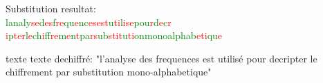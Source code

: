 \documentclass[10pt,xcolor=table]{beamer}
\begin{document}
\begin{frame}
\begin{exampleblock}{Substitution}
resultat:\\
\textcolor{green}{l}\textcolor{green}{a}\textcolor{green}{n}\textcolor{green}{a}\textcolor{green}{l}\textcolor{green}{y}\textcolor{red}{s}\textcolor{red}{e}\textcolor{green}{d}\textcolor{red}{e}\textcolor{red}{s}\textcolor{green}{f}\textcolor{red}{r}\textcolor{red}{e}\textcolor{green}{q}\textcolor{green}{u}\textcolor{red}{e}\textcolor{green}{n}\textcolor{green}{c}\textcolor{red}{e}\textcolor{red}{s}\textcolor{red}{e}\textcolor{red}{s}\textcolor{red}{t}\textcolor{green}{u}\textcolor{red}{t}\textcolor{red}{i}\textcolor{green}{l}\textcolor{red}{i}\textcolor{red}{s}\textcolor{red}{e}\textcolor{green}{p}\textcolor{green}{o}\textcolor{green}{u}\textcolor{red}{r}\textcolor{green}{d}\textcolor{red}{e}\textcolor{green}{c}\textcolor{red}{r}
\textcolor{red}{i}\textcolor{green}{p}\textcolor{red}{t}\textcolor{red}{e}\textcolor{red}{r}\textcolor{green}{l}\textcolor{red}{e}\textcolor{green}{c}\textcolor{green}{h}\textcolor{red}{i}\textcolor{green}{f}\textcolor{green}{f}\textcolor{red}{r}\textcolor{red}{e}\textcolor{green}{m}\textcolor{red}{e}\textcolor{green}{n}\textcolor{red}{t}\textcolor{green}{p}\textcolor{green}{a}\textcolor{red}{r}\textcolor{red}{s}\textcolor{green}{u}\textcolor{green}{b}\textcolor{red}{s}\textcolor{red}{t}\textcolor{red}{i}\textcolor{red}{t}\textcolor{green}{u}\textcolor{red}{t}\textcolor{red}{i}\textcolor{green}{o}\textcolor{green}{n}\textcolor{green}{m}\textcolor{green}{o}\textcolor{green}{n}\textcolor{green}{o}\textcolor{green}{a}\textcolor{green}{l}\textcolor{green}{p}\textcolor{green}{h}\textcolor{green}{a}\textcolor{green}{b}\textcolor{red}{e}\textcolor{red}{t}\textcolor{red}{i}\textcolor{green}{q}\textcolor{green}{u}\textcolor{red}{e}
\end{exampleblock}
\begin{exampleblock}{texte}
texte dechiffré:
"l'analyse des frequences est utilisé pour decripter le chiffrement par substitution mono-alphabetique"
\end{exampleblock}
\end{frame}
\end{document}

